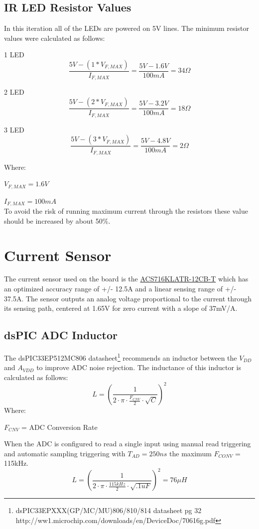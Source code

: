 \documentclass{article}
\begin{document}
\subsection{IR LED Resistor Values}
In this iteration all of the LEDs are powered on 5V lines. The minimum resistor values were calculated as follows:
\begin{description}
\item{1 LED}
\[\frac{5V-(1*V_{F,MAX})}{I_{F,MAX}}=\frac{5V-1.6V}{100mA} = 34\Omega\]
\item{2 LED}
\[\frac{5V-(2*V_{F,MAX})}{I_{F,MAX}}=\frac{5V-3.2V}{100mA} = 18\Omega\]
\item{3 LED}
\[\frac{5V-(3*V_{F,MAX})}{I_{F,MAX}}=\frac{5V-4.8V}{100mA} = 2\Omega\]
\end{description}
Where:

$V_{F,MAX} =1.6V$

$I_{F,MAX} =100mA$\\
To avoid the risk of running maximum current through the resistors these value should be increased by about 50\%.

\section{Current Sensor}
The current sensor used on the board is the
 \href{file:///Users/ajgriesemer/Downloads/ACS716-Datasheet%20(1).pdf}{ACS716KLATR-12CB-T}
which has an optimized accuracy range of +/- 12.5A and a linear sensing range of +/- 37.5A. The sensor outputs an analog voltage proportional to the current through its sensing path, centered at 1.65V for zero current with a slope of 37mV/A.
\subsection{dsPIC ADC Inductor}
The dsPIC33EP512MC806 datasheet\footnote{\raggedright dsPIC33EPXXX(GP/MC/MU)806/810/814 datasheet pg 32 http://ww1.microchip.com/downloads/en/DeviceDoc/70616g.pdf} 
recommends an inductor between the $V_{DD}$ and $A_{VDD}$ to improve ADC noise rejection. The inductance of this inductor is calculated as follows: 
\[ L = \left(\frac{1}{2\cdot\pi\cdot\frac{F_{CNV}}{2}\cdot\sqrt{C}} \right)^2 \]
Where: 

$F_{CNV}$ = ADC Conversion Rate

When the ADC is configured to read a single input using manual read triggering and automatic sampling triggering with $T_{AD} = 250ns$ the maximum $F_{CONV}$ = 115kHz.
\[L= \left(\frac{1}{2\cdot\pi\cdot\frac{115kHz}{2}\cdot\sqrt{.1uF}} \right)^2 = 76 \mu H\]
\end{document}
